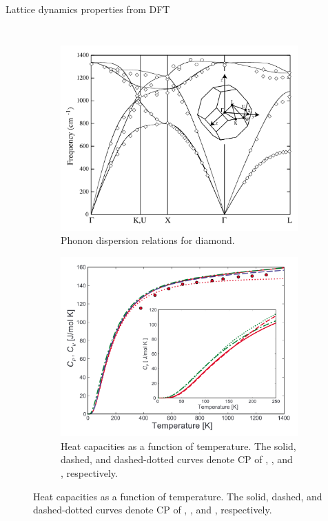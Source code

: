 \documentclass[aspectratio=169]{beamer}
\begin{document}
    \begin{frame}{Lattice dynamics properties from DFT}

        \begin{columns}

            \begin{figure}
                \centering
                \begin{subfigure}{\textwidth}
                    \centering
                    \includegraphics[width=0.4\linewidth]{lectures/figures/10_Phonon_Diamond.png}
                    \caption{Phonon dispersion relations for diamond.\cite{gonzeFirstprincipleStudiesLattice2005}}
                \end{subfigure}
                \begin{subfigure}{\textwidth}
                    \centering
                    \includegraphics[width=0.3\linewidth]{lectures/figures/10_Heat_capacities.png}
                    \caption{Heat capacities as a function of temperature. The solid, dashed, and dashed-dotted curves denote CP of , , and , respectively.\cite{togoFirstprinciplesPhononCalculations2010}}
                \end{subfigure}
            \end{figure}


\end{columns}
\end{frame}
\end{document}
